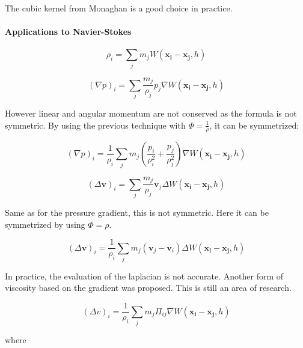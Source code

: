 The cubic kernel from Monaghan is a good choice in practice.

\paragraph{Applications to Navier-Stokes}

\begin{equation}
\rho_{i} = \sum_{j} m_{j}W(\mathbf{x_{i}}-\mathbf{x_{j}},h)
\end{equation}

\begin{equation}
\left(\nabla p\right)_{i} = \sum_{j} \frac{m_{j}}{\rho_{j}} p_{j} \nabla W(\mathbf{x_{i}}-\mathbf{x_{j}},h)
\end{equation}

However linear and angular momentum are not conserved as the formula is not symmetric. By using the previous technique with $\Phi = \frac{1}{\rho}$, it can be symmetrized:

\begin{equation}
\left(\nabla p\right)_{i} = 
\frac{1}{\rho_{i}}
\sum_{j} m_{j} \left( \frac{p_{i}}{\rho_{i}^{2}} + \frac{p_{j}}{\rho_{j}^{2}} \right) \nabla W(\mathbf{x_{i}}-\mathbf{x_{j}},h)
\end{equation}

\begin{equation}
\left(\Delta \mathbf{v}\right)_{i} = \sum_{j} \frac{m_{j}}{\rho_{j}} \mathbf{v}_{j} \Delta W(\mathbf{x_{i}}-\mathbf{x_{j}},h)
\end{equation}

Same as for the pressure gradient, this is not symmetric. Here it can be symmetrized by using $\Phi = \rho$.

\begin{equation}
\left(\Delta \mathbf{v}\right)_{i} = \frac{1}{\rho_{i}}\sum_{j} m_{j} \left( \mathbf{v}_{j}-\mathbf{v}_{i}\right) \Delta W(\mathbf{x_{i}}-\mathbf{x_{j}},h)
\end{equation}

In practice, the evaluation of the laplacian is not accurate. Another form of viscosity based on the gradient was proposed. This is still an area of research.

\begin{equation}
\left(\Delta v\right)_{i} = 
\frac{1}{\rho_{i}}
\sum_{j} m_{j} \Pi_{ij} \nabla W(\mathbf{x_{i}}-\mathbf{x_{j}},h)
\end{equation}

where 

